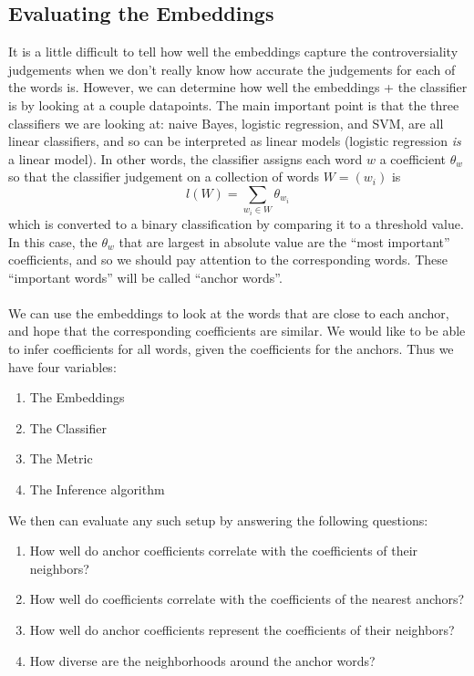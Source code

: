 \documentclass[11pt]{article} %
\begin{document}
\subsection{Evaluating the Embeddings}
It is a little difficult to tell how well the embeddings capture the controversiality judgements when we don't really know how accurate the judgements for each of the words is. However, we can determine how well the embeddings + the classifier is by looking at a couple datapoints. The main important point is that the three classifiers we are looking at: naive Bayes, logistic regression, and SVM, are all linear classifiers, and so can be interpreted as linear models (logistic regression \emph{is} a linear model). In other words, the classifier assigns each word $w$ a coefficient $\theta_w$ so that the classifier judgement on a collection of words $W = (w_i)$ is
\[ l(W) = \sum_{w_i \in W} \theta_{w_i} \]
which is converted to a binary classification by comparing it to a threshold value. In this case, the $\theta_w$ that are largest in absolute value are the ``most important'' coefficients, and so we should pay attention to the corresponding words. These ``important words'' will be called ``anchor words''. \\
\\
We can use the embeddings to look at the words that are close to each anchor, and hope that the corresponding coefficients are similar. We would like to be able to infer coefficients for all words, given the coefficients for the anchors. Thus we have four variables:
\begin{enumerate}
\item The Embeddings
\item The Classifier
\item The Metric
\item The Inference algorithm
\end{enumerate}

We then can evaluate any such setup by answering the following questions:

\begin{enumerate}
\item How well do anchor coefficients correlate with the coefficients of their neighbors?

\item How well do coefficients correlate with the coefficients of the nearest anchors?

\item How well do anchor coefficients represent the coefficients of their neighbors?

\item How diverse are the neighborhoods around the anchor words?
\end{enumerate}
\end{document}
